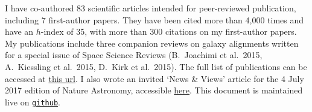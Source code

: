 I have co-authored 83 scientific articles intended for peer-reviewed 
publication, including 7 first-author papers. They have been cited more than 
4,000 times and have an $h$-index of 35, with more than 300 citations on my 
first-author papers. My publications include three companion reviews on galaxy 
alignments written for a special issue of Space Science Reviews (B.\ Joachimi et 
al.\ 2015, A.\ Kiessling et al.\ 2015, D.\ Kirk et al.\ 2015). The full list of 
publications can be accessed at \href{https://goo.gl/LAu9G4}{this url}. I also 
wrote an invited `News \& Views' article for the 4 July 2017 edition of Nature 
Astronomy, accessible 
\href{https://www.nature.com/articles/s41550-017-0181}{here}.
%
This document is maintained live on
\href{https://github.com/cristobal-sifon/cv/blob/master/Sifon_publications.pdf}{\texttt{github}}.

